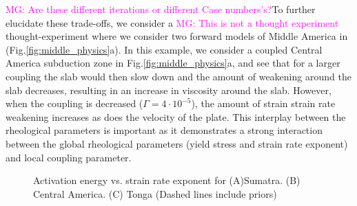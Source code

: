 \documentclass[12pt]{article}
\newcommand{\mgnote}[1]{\textcolor{magenta}{MG: #1}}
\begin{document}
\mgnote{Are these different iterations or different Case numbers's?}To further elucidate these trade-offs, we consider a \mgnote{This is not a thought experiment } thought-experiment where we consider two forward models of Middle America in (Fig.\ref{fig:middle_physics}a). In this example, we consider a coupled Central America subduction zone in Fig.\ref{fig:middle_physics}a, and see  that for a larger coupling the slab would then slow down and the amount of weakening around the slab decreases, resulting in an increase in viscosity around the slab. However, when the coupling is decreased ($\Gamma=4\cdot 10^{-5}$), the amount of strain strain rate weakening increases as does the velocity of the plate. This interplay between the rheological parameters is important as it demonstrates a strong interaction between the global rheological parameters (yield stress and strain rate exponent) and local coupling parameter.



\begin{figure}[H]
\centering
\hspace{-0.85cm}
\hspace{-0.1cm}
\hspace{-0.1cm}
 

\caption{Activation energy vs. strain rate exponent for (A)Sumatra. 
(B) Central America. 
(C) Tonga (Dashed lines include priors) }
\label{fig:activ_distrib}
\end{figure}
\end{document}
